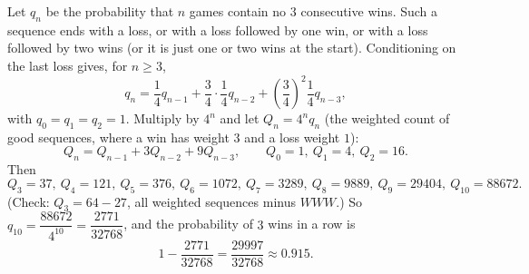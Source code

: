 Let $q_n$ be the probability that $n$ games contain no $3$ consecutive wins. Such a sequence ends with a loss, or with a loss followed by one win, or with a loss followed by two wins (or it is just one or two wins at the start). Conditioning on the last loss gives, for $n\ge3$,
\[q_n=\dfrac14q_{n-1}+\dfrac34\cdot\dfrac14q_{n-2}+\left(\dfrac34\right)^2\dfrac14q_{n-3},\]
with $q_0=q_1=q_2=1$. Multiply by $4^n$ and let $Q_n=4^nq_n$ (the weighted count of good sequences, where a win has weight $3$ and a loss weight $1$):
\[Q_n=Q_{n-1}+3Q_{n-2}+9Q_{n-3},\qquad Q_0=1,\ Q_1=4,\ Q_2=16.\]
Then
\[Q_3=37,\ Q_4=121,\ Q_5=376,\ Q_6=1072,\ Q_7=3289,\ Q_8=9889,\ Q_9=29404,\ Q_{10}=88672.\]
(Check: $Q_3=64-27$, all weighted sequences minus $WWW$.) So $q_{10}=\dfrac{88672}{4^{10}}=\dfrac{2771}{32768}$, and the probability of $3$ wins in a row is
\[1-\dfrac{2771}{32768}=\boxed{\dfrac{29997}{32768}}\approx0.915.\]
